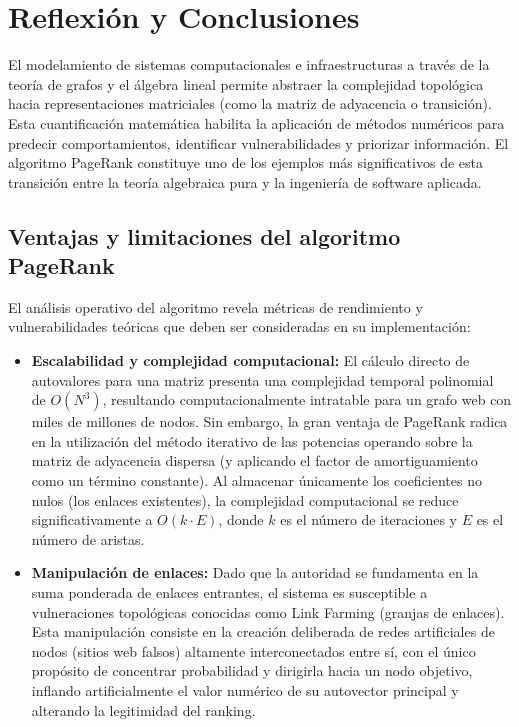 
\section{Reflexión y Conclusiones}
El modelamiento de sistemas computacionales e infraestructuras a través de la teoría de grafos y el álgebra lineal permite abstraer la complejidad topológica hacia representaciones matriciales (como la matriz de adyacencia o transición). 
Esta cuantificación matemática habilita la aplicación de métodos numéricos para predecir comportamientos, identificar vulnerabilidades y priorizar información. El algoritmo PageRank constituye uno de los ejemplos más significativos de esta 
transición entre la teoría algebraica pura y la ingeniería de software aplicada.

\subsection{Ventajas y limitaciones del algoritmo PageRank}
El análisis operativo del algoritmo revela métricas de rendimiento y vulnerabilidades teóricas que deben ser consideradas en su implementación: 

\begin{itemize}
    \item \textbf{Escalabilidad y complejidad computacional:} El cálculo directo de autovalores para una matriz presenta una complejidad temporal polinomial de $O(N^3)$, resultando computacionalmente intratable para un grafo 
    web con miles de millones de nodos. Sin embargo, la gran ventaja de PageRank radica en la utilización del método iterativo de las potencias operando sobre la matriz de adyacencia dispersa (y aplicando el factor de amortiguamiento 
    como un término constante). Al almacenar únicamente los coeficientes no nulos (los enlaces existentes), la complejidad computacional se reduce significativamente a $O(k \cdot E)$, donde $k$ es el número de iteraciones y $E$ es el número de aristas. \parencite{tigergraph}
    \item \textbf{Manipulación de enlaces:} Dado que la autoridad se fundamenta en la suma ponderada de enlaces entrantes, el sistema es susceptible a vulneraciones topológicas conocidas como Link Farming (granjas de enlaces). 
    Esta manipulación consiste en la creación deliberada de redes artificiales de nodos (sitios web falsos) altamente interconectados entre sí, con el único propósito de concentrar probabilidad y dirigirla hacia un nodo objetivo, 
    inflando artificialmente el valor numérico de su autovector principal y alterando la legitimidad del ranking. \parencite{needmylink2025}
\end{itemize}

